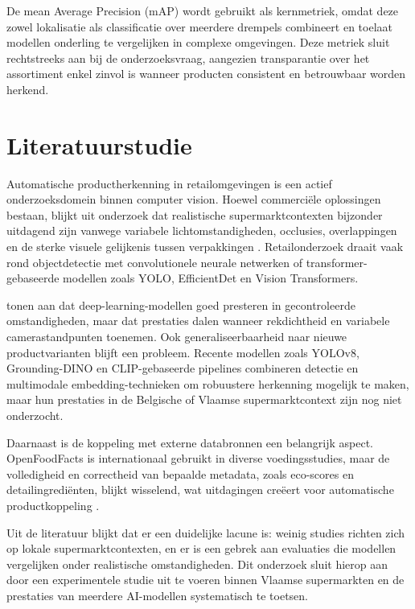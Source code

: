 De mean Average Precision (mAP) wordt gebruikt als kernmetriek, omdat deze zowel lokalisatie als classificatie over meerdere drempels combineert en toelaat modellen onderling te vergelijken in complexe omgevingen. Deze metriek sluit rechtstreeks aan bij de onderzoeksvraag, aangezien transparantie over het assortiment enkel zinvol is wanneer producten consistent en betrouwbaar worden herkend.



\section{Literatuurstudie}%
\label{sec:literatuurstudie}

Automatische productherkenning in retailomgevingen is een actief onderzoeksdomein binnen computer vision. Hoewel commerciële oplossingen bestaan, blijkt uit onderzoek dat realistische supermarktcontexten bijzonder uitdagend zijn vanwege variabele lichtomstandigheden, occlusies, overlappingen en de sterke visuele gelijkenis tussen verpakkingen \autocite{santra2019}. Retailonderzoek draait vaak rond objectdetectie met convolutionele neurale netwerken of transformer-gebaseerde modellen zoals YOLO, EfficientDet en Vision Transformers.

\textcite{fuchs2019} tonen aan dat deep-learning-modellen goed presteren in gecontroleerde omstandigheden, maar dat prestaties dalen wanneer rekdichtheid en variabele camerastandpunten toenemen. Ook generaliseerbaarheid naar nieuwe productvarianten blijft een probleem. Recente modellen zoals YOLOv8, Grounding-DINO en CLIP-gebaseerde pipelines combineren detectie en multimodale embedding-technieken om robuustere herkenning mogelijk te maken, maar hun prestaties in de Belgische of Vlaamse supermarktcontext zijn nog niet onderzocht.

Daarnaast is de koppeling met externe databronnen een belangrijk aspect. OpenFoodFacts is internationaal gebruikt in diverse voedingsstudies, maar de volledigheid en correctheid van bepaalde metadata, zoals eco-scores en detailingrediënten, blijkt wisselend, wat uitdagingen creëert voor automatische productkoppeling \autocite{wur2025}.

Uit de literatuur blijkt dat er een duidelijke lacune is: weinig studies richten zich op lokale supermarktcontexten, en er is een gebrek aan evaluaties die modellen vergelijken onder realistische omstandigheden. Dit onderzoek sluit hierop aan door een experimentele studie uit te voeren binnen Vlaamse supermarkten en de prestaties van meerdere AI-modellen systematisch te toetsen.

